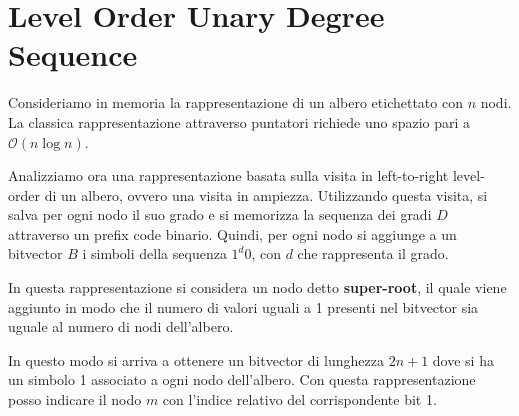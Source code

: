 \section{Level Order Unary Degree Sequence}
Consideriamo in memoria la rappresentazione di un albero etichettato con $n$ nodi.
La classica rappresentazione attraverso puntatori richiede uno spazio pari a
$\mathcal{O}(n \log n)$.

Analizziamo ora una rappresentazione basata sulla visita in left-to-right
level-order di un albero, ovvero una visita in ampiezza. Utilizzando questa
visita, si salva per ogni nodo il suo grado e si memorizza la sequenza dei gradi
$D$ attraverso un prefix code binario. Quindi, per ogni nodo si aggiunge a un
bitvector $B$ i simboli della sequenza $1^d0$, con $d$ che rappresenta il grado.

In questa rappresentazione si considera un nodo detto \textbf{super-root}, il
quale viene aggiunto in modo che il numero di valori uguali a 1 presenti nel
bitvector sia uguale al numero di nodi dell'albero.

In questo modo si arriva a ottenere un bitvector di lunghezza $2n + 1$ dove si
ha un simbolo 1 associato a ogni nodo dell'albero. Con questa rappresentazione
posso indicare il nodo $m$ con l'indice relativo del corrispondente bit 1.

